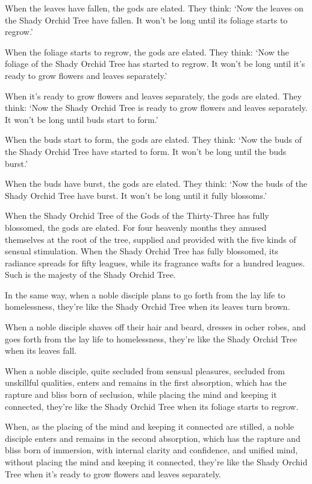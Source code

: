 \documentclass[12pt,openany]{book}%
\begin{document}
When the leaves have fallen, the gods are elated. They think: ‘Now the leaves on the Shady Orchid Tree have fallen. It won’t be long until its foliage starts to regrow.’ 

When the foliage starts to regrow, the gods are elated. They think: ‘Now the foliage of the Shady Orchid Tree has started to regrow. It won’t be long until it’s ready to grow flowers and leaves separately.’ 

When it’s ready to grow flowers and leaves separately, the gods are elated. They think: ‘Now the Shady Orchid Tree is ready to grow flowers and leaves separately. It won’t be long until buds start to form.’ 

When the buds start to form, the gods are elated. They think: ‘Now the buds of the Shady Orchid Tree have started to form. It won’t be long until the buds burst.’ 

When the buds have burst, the gods are elated. They think: ‘Now the buds of the Shady Orchid Tree have burst. It won’t be long until it fully blossoms.’ 

When the Shady Orchid Tree of the Gods of the Thirty-Three has fully blossomed, the gods are elated. For four heavenly months they amused themselves at the root of the tree, supplied and provided with the five kinds of sensual stimulation. When the Shady Orchid Tree has fully blossomed, its radiance spreads for fifty leagues, while its fragrance wafts for a hundred leagues. Such is the majesty of the Shady Orchid Tree. 

In the same way, when a noble disciple plans to go forth from the lay life to homelessness, they’re like the Shady Orchid Tree when its leaves turn brown. 

When a noble disciple shaves off their hair and beard, dresses in ocher robes, and goes forth from the lay life to homelessness, they’re like the Shady Orchid Tree when its leaves fall. 

When a noble disciple, quite secluded from sensual pleasures, secluded from unskillful qualities, enters and remains in the first absorption, which has the rapture and bliss born of seclusion, while placing the mind and keeping it connected, they’re like the Shady Orchid Tree when its foliage starts to regrow. 

When, as the placing of the mind and keeping it connected are stilled, a noble disciple enters and remains in the second absorption, which has the rapture and bliss born of immersion, with internal clarity and confidence, and unified mind, without placing the mind and keeping it connected, they’re like the Shady Orchid Tree when it’s ready to grow flowers and leaves separately. 
\end{document}
